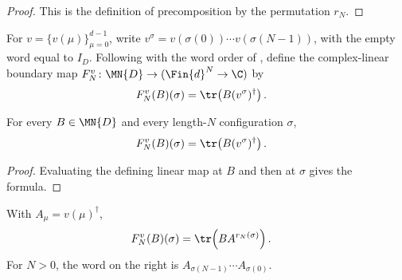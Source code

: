 \begin{proof}
    \leanok
    This is the definition of precomposition by the permutation $r_N$.
\end{proof}

\begin{definition}\label{def:fnw_boundary_map}
    \leanok
    For $v=\{v(\mu)\}_{\mu=0}^{d-1}$, write
    $v^\sigma=v(\sigma(0))\cdots v(\sigma(N-1))$, with the empty word equal
    to $I_D$.  Following \cite[Equation~(5.5)]{Fannes1992Finitely} with the
    word order of \cite[Equation~(5.4)]{Fannes1992Finitely}, define the
    complex-linear boundary map $F_N^v\colon\MN{D}\to(\Fin{d}^{N}\to\C)$ by
    \begin{align}
        F_N^v(B)(\sigma)
         & =\tr\!\left(B(v^\sigma)^\dagger\right).
        \label{eq:fnw_boundary_map}
    \end{align}
\end{definition}

\begin{lemma}
    \label{thm:fnw_boundary_map_apply}
    \leanok
    For every $B\in\MN{D}$ and every length-$N$ configuration $\sigma$,
    \begin{align}
        F_N^v(B)(\sigma)
         & =\tr\!\left(B(v^\sigma)^\dagger\right).
    \end{align}
\end{lemma}

\begin{proof}
    \leanok
    Evaluating the defining linear map at $B$ and then at $\sigma$ gives the
    formula.
\end{proof}

\begin{lemma}
    \label{thm:fnw_boundary_map_apply_eq_trace_reverse}
    \leanok
    With $A_\mu=v(\mu)^\dagger$,
    \begin{align}
        F_N^v(B)(\sigma)
         & =\tr\!\left(B A^{r_N(\sigma)}\right).
        \label{eq:fnw_boundary_reverse_word}
    \end{align}
    For $N>0$, the word on the right is
    $A_{\sigma(N-1)}\cdots A_{\sigma(0)}$.
\end{lemma}

